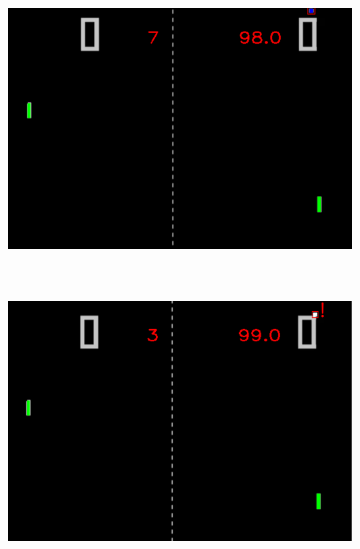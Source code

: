 \documentclass{report}
\begin{document}
\begin{figure}
        \begin{subfigure}{\linewidth}
            \centering
            \includegraphics[height=0.3\textheight]{loseBef.png}
        \end{subfigure}
        \\[1.5em]
        \begin{subfigure}{\linewidth}
            \centering
            \includegraphics[height=0.3\textheight]{loseDur.png}
        \end{subfigure}
        \\[1.5em]
        \begin{subfigure}{\linewidth}
            \centering

\end{subfigure}
\end{figure}
\end{document}
